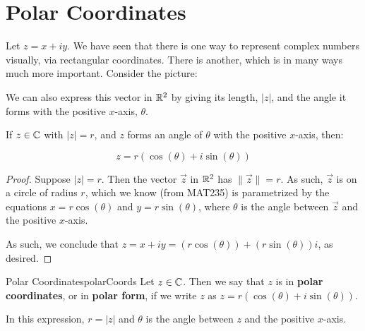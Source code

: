 \section{Polar Coordinates}

Let $z = x + iy$. We have seen that there is one way to represent complex numbers visually, via rectangular coordinates. There is another, which is in many ways much more important. Consider the picture:

\begin{center}
\end{center}

We can also express this vector in $\mathbb{R}^2$ by giving its length, $|z|$, and the angle it forms with the positive $x$-axis, $\theta$.

\begin{lem} If $z\in \mathbb{C}$ with $|z| = r$, and $z$ forms an angle of $\theta$ with the positive $x$-axis, then:

$$z = r(\cos(\theta) + i\sin(\theta))$$
\end{lem}

\begin{proof} Suppose $|z| = r$. Then the vector $\vec{z}$ in $\mathbb{R}^2$ has $\lVert \vec{z}\rVert = r$. As such, $\vec{z}$ is on a circle of radius $r$, which we know (from MAT235) is parametrized by the equations $x = r\cos(\theta)$ and $y = r\sin(\theta)$, where $\theta$ is the angle between $\vec{z}$ and the positive $x$-axis.

As such, we conclude that $z = x + iy = (r\cos(\theta)) + (r\sin(\theta))i$, as desired.
\end{proof}


\begin{defbo}{Polar Coordinates}{polarCoords}
 Let $z\in \mathbb{C}$. Then we say that $z$ is in {\bf polar coordinates}, or in {\bf polar form}, if we write $z$ as $z = r(\cos(\theta) + i\sin(\theta))$.

In this expression, $r = |z|$ and $\theta$ is the angle between $z$ and the positive $x$-axis.
\end{defbo}

